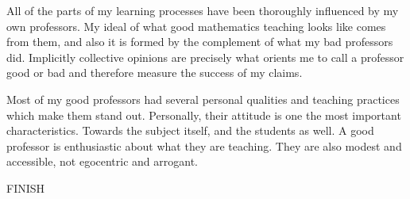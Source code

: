 \documentclass[a4paper,12pt,final]{book}
\begin{document}
All of the parts of my learning processes have been thoroughly influenced by my own professors. My ideal of what good mathematics teaching looks like comes from them, and also it is formed by the complement of what my bad professors did. Implicitly collective opinions are precisely what orients me to call a professor good or bad and therefore measure the success of my claims.\par 
Most of my good professors had several personal qualities and teaching practices which make them stand out. Personally, their attitude is one the most important characteristics. Towards the subject itself, and the students as well. A good professor is enthusiastic about what they are teaching. They are also modest and accessible, not egocentric and arrogant.\par
FINISH
\end{document}
